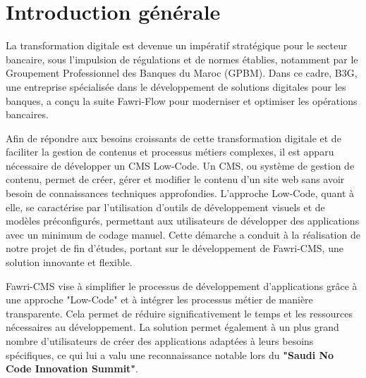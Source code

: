 \chapter*{Introduction générale}


\label{chap: Conclusion générale}


\hspace{\parindent}La transformation digitale est devenue un impératif stratégique pour le secteur bancaire, sous l'impulsion de régulations et de normes établies, notamment par le Groupement Professionnel des Banques du Maroc (GPBM). Dans ce cadre, B3G, une entreprise spécialisée dans le développement de solutions digitales pour les banques, a conçu la suite Fawri-Flow pour moderniser et optimiser les opérations bancaires.

Afin de répondre aux besoins croissants de cette transformation digitale et de faciliter la gestion de contenus et processus métiers complexes, il est apparu nécessaire de développer un CMS Low-Code. Un CMS, ou système de gestion de contenu, permet de créer, gérer et modifier le contenu d'un site web sans avoir besoin de connaissances techniques approfondies. L'approche Low-Code, quant à elle, se caractérise par l'utilisation d'outils de développement visuels et de modèles préconfigurés, permettant aux utilisateurs de développer des applications avec un minimum de codage manuel. Cette démarche a conduit à la réalisation de notre projet de fin d'études, portant sur le développement de Fawri-CMS, une solution innovante et flexible.

Fawri-CMS vise à simplifier le processus de développement d'applications grâce à une approche "Low-Code" et à intégrer les processus métier de manière transparente. Cela permet de réduire significativement le temps et les ressources nécessaires au développement. La solution permet également à un plus grand nombre d'utilisateurs de créer des applications adaptées à leurs besoins spécifiques, ce qui lui a valu une reconnaissance notable lors du \textbf{"Saudi No Code Innovation Summit"}.

